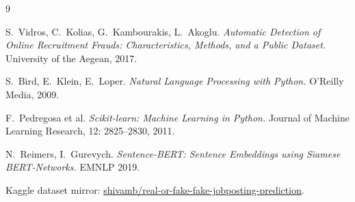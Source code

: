 \documentclass[11pt,a4paper]{article}
\begin{document}
\begin{thebibliography}{9}

S.~Vidros, C.~Kolias, G.~Kambourakis, L.~Akoglu.
\emph{Automatic Detection of Online Recruitment Frauds: Characteristics,
Methods, and a Public Dataset.}
University of the Aegean, 2017.

S.~Bird, E.~Klein, E.~Loper.
\emph{Natural Language Processing with Python.}
O'Reilly Media, 2009.

F.~Pedregosa et al.
\emph{Scikit-learn: Machine Learning in Python.}
Journal of Machine Learning Research, 12: 2825--2830, 2011.

N.~Reimers, I.~Gurevych.
\emph{Sentence-BERT: Sentence Embeddings using Siamese BERT-Networks.}
EMNLP 2019.

Kaggle dataset mirror:
\href{https://www.kaggle.com/datasets/shivamb/real-or-fake-fake-jobposting-prediction}
     {shivamb/real-or-fake-fake-jobposting-prediction}.

\end{thebibliography}
\end{document}
